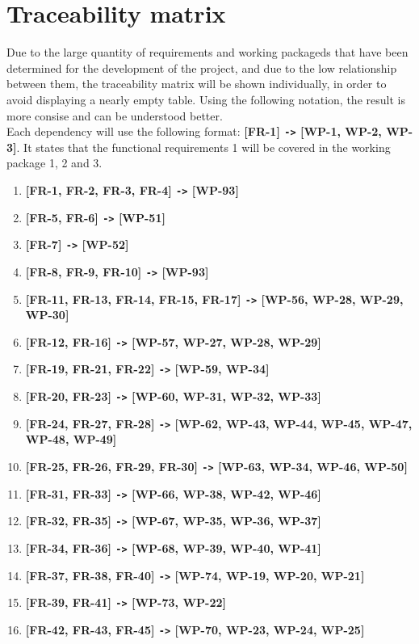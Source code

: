 \documentclass[a4paper, 12pt, oneside]{book}
\begin{document}
\section{Traceability matrix}
Due to the large quantity of requirements and working packageds that have been determined for the development of the project, and due to the low relationship between them, the traceability matrix will be shown individually, in order to avoid displaying a nearly empty table. Using the following notation, the result is more consise and can be understood better.
\\[8pt]
Each dependency will use the following format: \textbf{[FR-1] \texttt{->} [WP-1, WP-2, WP-3]}. It states that the functional requirements 1 will be covered in the working package 1, 2 and 3.
\begin{enumerate}[label = -]
	\item \textbf{[FR-1, FR-2, FR-3, FR-4] \texttt{->} [WP-93]}
	\item \textbf{[FR-5, FR-6] \texttt{->} [WP-51]}
	\item \textbf{[FR-7] \texttt{->} [WP-52]}
	\item \textbf{[FR-8, FR-9, FR-10] \texttt{->} [WP-93]}
	\item \textbf{[FR-11, FR-13, FR-14, FR-15, FR-17] \texttt{->} [WP-56, WP-28, WP-29, WP-30]}
	\item \textbf{[FR-12, FR-16] \texttt{->} [WP-57, WP-27, WP-28, WP-29]}
	\item \textbf{[FR-19, FR-21, FR-22] \texttt{->} [WP-59, WP-34]}
	\item \textbf{[FR-20, FR-23] \texttt{->} [WP-60, WP-31, WP-32, WP-33]}
	\item \textbf{[FR-24, FR-27, FR-28] \texttt{->} [WP-62, WP-43, WP-44, WP-45, WP-47, WP-48, WP-49]}
	\item \textbf{[FR-25, FR-26, FR-29, FR-30] \texttt{->} [WP-63, WP-34, WP-46, WP-50]}
	\item \textbf{[FR-31, FR-33] \texttt{->} [WP-66, WP-38, WP-42, WP-46]}
	\item \textbf{[FR-32, FR-35] \texttt{->} [WP-67, WP-35, WP-36, WP-37]}
	\item \textbf{[FR-34, FR-36] \texttt{->} [WP-68, WP-39, WP-40, WP-41]}
	\item \textbf{[FR-37, FR-38, FR-40] \texttt{->} [WP-74, WP-19, WP-20, WP-21]}
	\item \textbf{[FR-39, FR-41] \texttt{->} [WP-73, WP-22]}
	\item \textbf{[FR-42, FR-43, FR-45] \texttt{->} [WP-70, WP-23, WP-24, WP-25]}

\end{enumerate}
\end{document}
